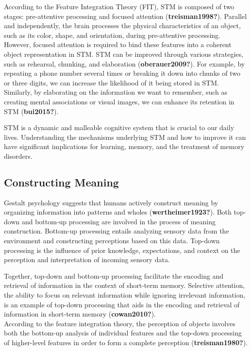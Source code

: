 \documentclass[print]{nuthesis}
\begin{document}
According to the Feature Integration Theory (FIT), STM is composed of two stages: pre-attentive processing and focused attention (\textbf{treisman1998?}).
Parallel and independently, the brain processes the physical characteristics of an object, such as its color, shape, and orientation, during pre-attentive processing.
However, focused attention is required to bind these features into a coherent object representation in STM.
STM can be improved through various strategies, such as rehearsal, chunking, and elaboration (\textbf{oberauer2009?}).
For example, by repeating a phone number several times or breaking it down into chunks of two or three digits, we can increase the likelihood of it being stored in STM.
Similarly, by elaborating on the information we want to remember, such as creating mental associations or visual images, we can enhance its retention in STM (\textbf{bui2015?}).

STM is a dynamic and malleable cognitive system that is crucial to our daily lives.
Understanding the mechanisms underlying STM and how to improve it can have significant implications for learning, memory, and the treatment of memory disorders.

\hypertarget{constructing-meaning}{%
\subsection{Constructing Meaning}\label{constructing-meaning}}

Gestalt psychology suggests that humans actively construct meaning by organizing information into patterns and wholes (\textbf{wertheimer1923?}).
Both top-down and bottom-up processing are involved in the process of meaning construction.
Bottom-up processing entails analyzing sensory data from the environment and constructing perceptions based on this data.
Top-down processing is the influence of prior knowledge, expectations, and context on the perception and interpretation of incoming sensory data.

Together, top-down and bottom-up processing facilitate the encoding and retrieval of information in the context of short-term memory.
Selective attention, the ability to focus on relevant information while ignoring irrelevant information, is an example of top-down processing that aids in the encoding and retrieval of information in short-term memory (\textbf{cowan2010?}).\\
According to the feature integration theory, the perception of objects involves both the bottom-up analysis of individual features and the top-down processing of higher-level features in order to form a complete perception (\textbf{treisman1980?}).
\end{document}
